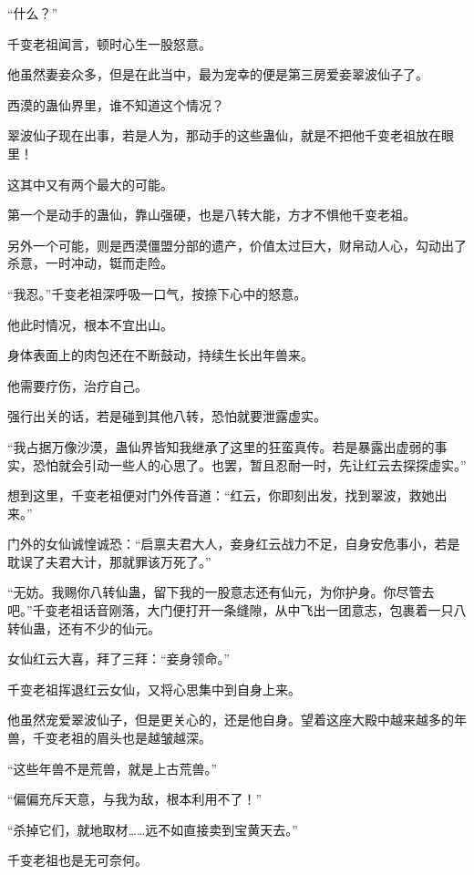 
\begin{this_body}

“什么？”

千变老祖闻言，顿时心生一股怒意。

他虽然妻妾众多，但是在此当中，最为宠幸的便是第三房爱妾翠波仙子了。

西漠的蛊仙界里，谁不知道这个情况？

翠波仙子现在出事，若是人为，那动手的这些蛊仙，就是不把他千变老祖放在眼里！

这其中又有两个最大的可能。

第一个是动手的蛊仙，靠山强硬，也是八转大能，方才不惧他千变老祖。

另外一个可能，则是西漠僵盟分部的遗产，价值太过巨大，财帛动人心，勾动出了杀意，一时冲动，铤而走险。

“我忍。”千变老祖深呼吸一口气，按捺下心中的怒意。

他此时情况，根本不宜出山。

身体表面上的肉包还在不断鼓动，持续生长出年兽来。

他需要疗伤，治疗自己。

强行出关的话，若是碰到其他八转，恐怕就要泄露虚实。

“我占据万像沙漠，蛊仙界皆知我继承了这里的狂蛮真传。若是暴露出虚弱的事实，恐怕就会引动一些人的心思了。也罢，暂且忍耐一时，先让红云去探探虚实。”

想到这里，千变老祖便对门外传音道：“红云，你即刻出发，找到翠波，救她出来。”

门外的女仙诚惶诚恐：“启禀夫君大人，妾身红云战力不足，自身安危事小，若是耽误了夫君大计，那就罪该万死了。”

“无妨。我赐你八转仙蛊，留下我的一股意志还有仙元，为你护身。你尽管去吧。”千变老祖话音刚落，大门便打开一条缝隙，从中飞出一团意志，包裹着一只八转仙蛊，还有不少的仙元。

女仙红云大喜，拜了三拜：“妾身领命。”

千变老祖挥退红云女仙，又将心思集中到自身上来。

他虽然宠爱翠波仙子，但是更关心的，还是他自身。望着这座大殿中越来越多的年兽，千变老祖的眉头也是越皱越深。

“这些年兽不是荒兽，就是上古荒兽。”

“偏偏充斥天意，与我为敌，根本利用不了！”

“杀掉它们，就地取材……远不如直接卖到宝黄天去。”

千变老祖也是无可奈何。


\end{this_body}
